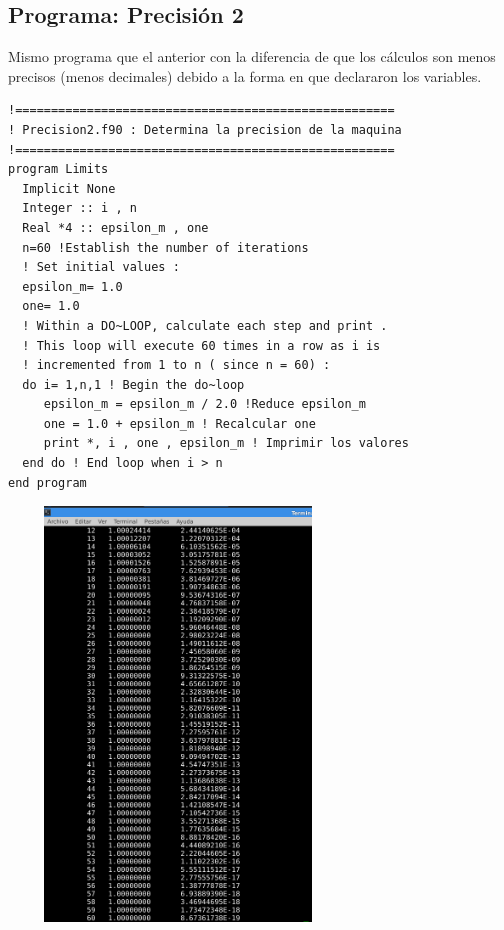 \documentclass[12pt]{article}
\begin{document}
\subsection{Programa: Precisión 2}
Mismo programa que el anterior con la diferencia de que los cálculos son menos precisos (menos decimales) debido a la forma en que declararon los variables.
\begin{verbatim}
!=====================================================
! Precision2.f90 : Determina la precision de la maquina
!=====================================================
program Limits
  Implicit None
  Integer :: i , n
  Real *4 :: epsilon_m , one
  n=60 !Establish the number of iterations 
  ! Set initial values : 
  epsilon_m= 1.0
  one= 1.0
  ! Within a DO~LOOP, calculate each step and print .
  ! This loop will execute 60 times in a row as i is
  ! incremented from 1 to n ( since n = 60) : 
  do i= 1,n,1 ! Begin the do~loop
     epsilon_m = epsilon_m / 2.0 !Reduce epsilon_m
     one = 1.0 + epsilon_m ! Recalcular one
     print *, i , one , epsilon_m ! Imprimir los valores
  end do ! End loop when i > n
end program
\end{verbatim}
\begin{center}
\includegraphics[width=9cm, height=11cm]{Precision2}
\end{center}
\pagebreak
\end{document}
